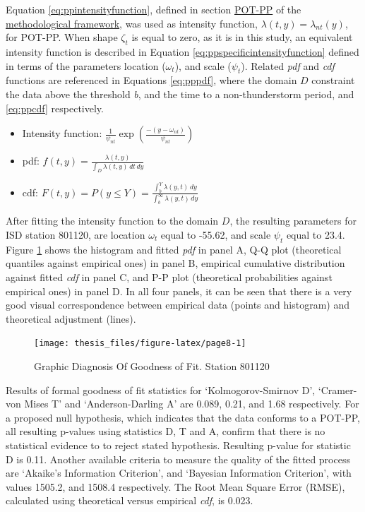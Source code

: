 \documentclass[12pt,oneside]{reedthesis}
\begin{document}
Equation \eqref{eq:ppintensityfunction}, defined in section \protect\hyperlink{method-pot-pp}{POT-PP} of the \protect\hyperlink{rmd-thefra}{methodological framework}, was used as intensity function, \(\lambda(t, y) = \lambda_{nt}(y)\), for POT-PP. When shape \(\zeta_t\) is equal to zero, as it is in this study, an equivalent intensity function is described in Equation \eqref{eq:ppspecificintensityfunction} defined in terms of the parameters location (\(\omega_t\)), and scale (\(\psi_t\)). Related \emph{pdf} and \emph{cdf} functions are referenced in Equations \eqref{eq:pppdf}, where the domain \(D\) constraint the data above the threshold \emph{b}, and the time to a non-thunderstorm period, and \eqref{eq:ppcdf} respectively.
\begin{itemize}
\item
  Intensity function: \(\frac{1}{\psi_{nt}}\exp\left(\frac{-(y-\omega_{nt})}{\psi_{nt}}\right)\)
\item
  pdf: \(f(t,y) = \frac{\lambda(t,y)}{\int_D\lambda(t,y)\,dt\,dy}\)
\item
  cdf: \(F(t,y) = P(y \leq Y) = \frac{\int_b^Y\lambda(y,t)\,dy}{\int_b^\infty\lambda(y,t)\,dy}\)
\end{itemize}
After fitting the intensity function to the domain \(D\), the resulting parameters for ISD station 801120, are location \(\omega_t\) equal to -55.62, and scale \(\psi_t\) equal to 23.4. Figure \ref{fig:page8} shows the histogram and fitted \emph{pdf} in panel A, Q-Q plot (theoretical quantiles against empirical ones) in panel B, empirical cumulative distribution against fitted \emph{cdf} in panel C, and P-P plot (theoretical probabilities against empirical ones) in panel D. In all four panels, it can be seen that there is a very good visual correspondence between empirical data (points and histogram) and theoretical adjustment (lines).
\begin{figure}

{\centering \texttt{[image: thesis\_files/figure-latex/page8-1]} 

}

\caption{Graphic Diagnosis Of Goodness of Fit. Station 801120}\label{fig:page8}
\end{figure}
Results of formal goodness of fit statistics for `Kolmogorov-Smirnov D', `Cramer-von Mises T' and `Anderson-Darling A' are 0.089, 0.21, and 1.68 respectively. For a proposed null hypothesis, which indicates that the data conforms to a POT-PP, all resulting p-values using statistics D, T and A, confirm that there is no statistical evidence to to reject stated hypothesis. Resulting p-value for statistic D is 0.11. Another available criteria to measure the quality of the fitted process are `Akaike's Information Criterion', and `Bayesian Information Criterion', with values 1505.2, and 1508.4 respectively. The Root Mean Square Error (RMSE), calculated using theoretical versus empirical \emph{cdf}, is 0.023.
\end{document}
